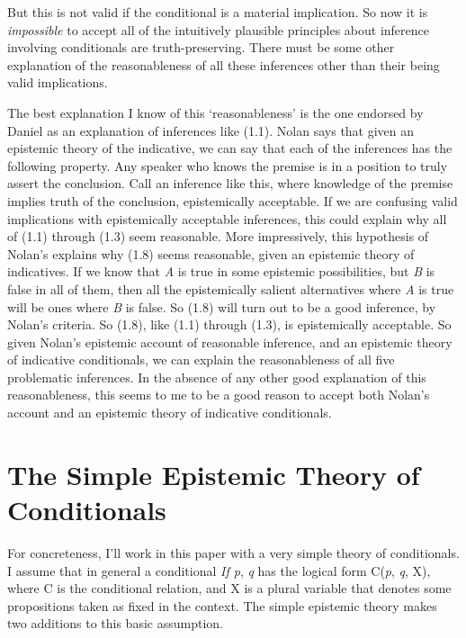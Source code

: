 \noindent But this is not valid if the conditional is a material implication. So now it is \textit{impossible} to accept all of the intuitively plausible principles about inference involving conditionals are truth-preserving. There must be some other explanation of the reasonableness of all these inferences other than their being valid implications.

The best explanation I know of this `reasonableness' is the one endorsed by Daniel \cite{Nolan2003} as an explanation of inferences like (1.1). Nolan says that given an epistemic theory of the indicative, we can say that each of the inferences has the following property. Any speaker who knows the premise is in a position to truly assert the conclusion. Call an inference like this, where knowledge of the premise implies truth of the conclusion, epistemically acceptable. If we are confusing valid implications with epistemically acceptable inferences, this could explain why all of (1.1) through (1.3) seem reasonable. More impressively, this hypothesis of Nolan's explains why (1.8) seems reasonable, given an epistemic theory of indicatives. If we know that \textit{A} is true in some epistemic possibilities, but \textit{B} is false in all of them, then all the epistemically salient alternatives where \textit{A} is true will be ones where \textit{B} is false. So (1.8) will turn out to be a good inference, by Nolan's criteria. So (1.8), like (1.1) through (1.3), is epistemically acceptable. So given Nolan's epistemic account of reasonable inference, and an epistemic theory of indicative conditionals, we can explain the reasonableness of all five problematic inferences. In the absence of any other good explanation of this reasonableness, this seems to me to be a good reason to accept both Nolan's account and an epistemic theory of indicative conditionals.


\section{The Simple Epistemic Theory of Conditionals}

For concreteness, I'll work in this paper with a very simple theory of conditionals. I assume that in general a conditional \textit{If p}, \textit{q} has the logical form C(\textit{p}, \textit{q}, X), where C is the conditional relation, and X is a plural variable that denotes some propositions taken as fixed in the context. The simple epistemic theory makes two additions to this basic assumption.

